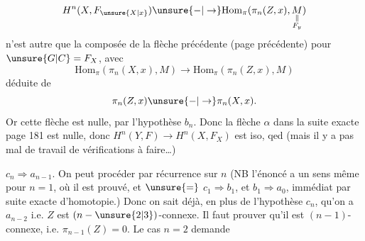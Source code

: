 \[
H^n(X,F_{\unsure{X|x}})\unsure{-|\to}\mathrm{Hom}_\pi(\pi_n(Z,x),\underset{\substack{\Vert\\ F_y}}{M})
\]
n'est autre que la composée de la flèche précédente (page précédente) pour $\unsure{G|C}=F_X$, avec
\[
\mathrm{Hom}_\pi(\pi_n(X,x),M)\to\mathrm{Hom}_\pi(\pi_n(Z,x),M)
\]
déduite de
\[
\pi_n(Z,x)\unsure{-|\to}\pi_n(X,x).
\]
Or cette flèche est nulle, par l'hypothèse $b_n$. Donc la flèche $\alpha$ dans la suite exacte page 181 est nulle, donc $H^n(Y,F)\to H^n(X,F_X)$ est iso, qed (mais il y a pas mal de travail de vérifications à faire\ldots)

$c_n\Rightarrow a_{n-1}$. On peut procéder par récurrence sur $n$ (NB l'énoncé a un sens même pour $n=1$, où il est prouvé, et $\unsure{=}$ $c_1\Rightarrow b_1$, et $b_1\Rightarrow a_0$,  immédiat par suite exacte d'homotopie.)
Donc on sait déjà, en plus de l'hypothèse $c_n$, qu'on a $a_{n-2}$ i.e. $Z$ est $(n-\unsure{2|3})$-connexe. Il faut prouver qu'il est \inserted{$\unsure{=}$} $(n-1)$-connexe, i.e. $\pi_{n-1}(Z)=0$. Le cas $n=2$ demande

